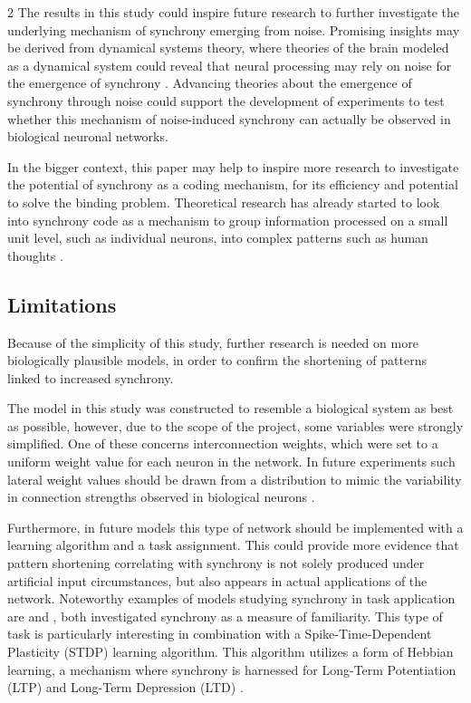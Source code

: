 \documentclass[12pt,a4paper]{article}
\begin{document}
\begin{multicols}{2}
            The results in this study could inspire future research to further investigate the underlying mechanism of synchrony emerging from noise. Promising insights may be derived from dynamical systems theory, where theories of the brain modeled as a dynamical system could reveal that neural processing may rely on noise for the emergence of synchrony \cite{Y}. Advancing theories about the emergence of synchrony through noise could support the development of experiments to test whether this mechanism of noise-induced synchrony can actually be observed in biological neuronal networks.

            In the bigger context, this paper may help to inspire more research to investigate the potential of synchrony as a coding mechanism, for its efficiency and potential to solve the binding problem. Theoretical research has already started to look into synchrony code as a mechanism to group information processed on a small unit level, such as individual neurons, into complex patterns such as human thoughts \cite{G}.


        \subsection {Limitations}
            Because of the simplicity of this study, further research is needed on more biologically plausible models, in order to confirm the shortening of patterns linked to increased synchrony.
            
            The model in this study was constructed to resemble a biological system as best as possible, however, due to the scope of the project, some variables were strongly simplified. One of these concerns interconnection weights, which were set to a uniform weight value for each neuron in the network. In future experiments such lateral weight values should be drawn from a distribution to mimic the variability in connection strengths observed in biological neurons \cite{J}.
            
            Furthermore, in future models this type of network should be implemented with a learning algorithm and a task assignment. This could provide more evidence that pattern shortening correlating with synchrony is not solely produced under artificial input circumstances, but also appears in actual applications of the network. Noteworthy examples of models studying synchrony in task application are \textcite{L} and \textcite{M}, both investigated synchrony as a measure of familiarity. This type of task is particularly interesting in combination with a Spike-Time-Dependent Plasticity (STDP) learning algorithm. This algorithm utilizes a form of Hebbian learning, a mechanism where synchrony is harnessed for Long-Term Potentiation (LTP) and Long-Term Depression (LTD) \cite{A, L}.
            

\end{multicols}
\end{document}
